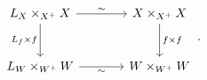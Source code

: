 \[
\begin{tikzcd}[column sep=large,row sep=large]
  L_X\times_{X^+}X
    \arrow[r,"\sim"]
    \arrow[d,"L_f\times f"']
  &
  X\times_{X^+}X
    \arrow[d,"f\times f"]
  \\
  L_W\times_{W^+}W
    \arrow[r,"\sim"']
  &
  W\times_{W^+}W
\end{tikzcd}
\,.
\]
